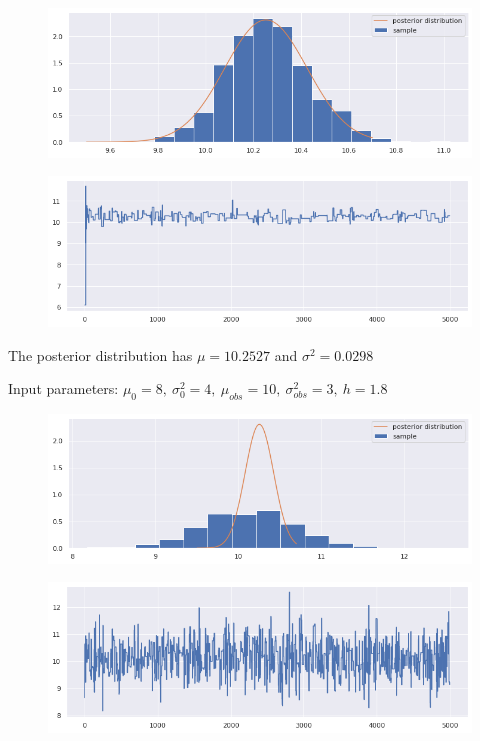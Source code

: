 \documentclass {article}
\begin{document}
\begin{figure}[h!]
	\centering
	\includegraphics[width=\textwidth]{immagini_abc/S10.5}	
	\caption{}
\end{figure}
\begin{figure}[h!]
	\centering
	\includegraphics[width=\textwidth]{immagini_abc/sampleS10.5}	
	\caption{}
\end{figure}


The posterior distribution has $\mu=10.2527$ and $\sigma^2=0.0298$ 
\begin{center} Input parameters: $\mu_{0}=8,\  \sigma_{0}^2=4,\  \mu_{obs}=10,\  \sigma_{obs}^2 =3,\ h=1.8$  \end{center}
\begin{figure}[h!]
	\centering
	\includegraphics[width=\textwidth]{immagini_abc/S11.8}	
	\caption{}
\end{figure}
\begin{figure}[h!]
	\centering
	\includegraphics[width=\textwidth]{immagini_abc/sampleS11.8}	
	\caption{}
\end{figure}
\end{document}

